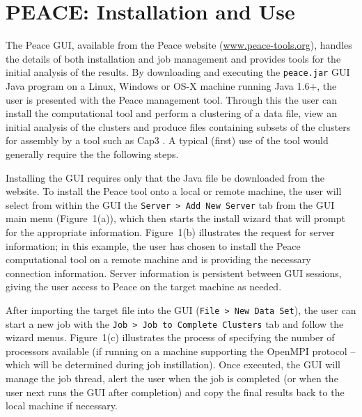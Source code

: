 \documentclass[a4,center,fleqn]{NAR}
\begin{document}
\enlargethispage{-65.1pt}

\section{PEACE: Installation and Use}

The {\sc Peace} GUI, available from the {\sc Peace} website
(\href{http://www.peace-tools.org}{www.peace-tools.org}), handles the
details of both installation and job management and provides tools for
the initial analysis of the results.  By downloading and executing the
{\tt peace.jar} GUI Java program on a Linux, Windows or OS-X machine
running Java 1.6+, the user is presented with the {\sc Peace}
management tool.  Through this the user can install the computational
tool and perform a clustering of a data file, view an initial analysis
of the clusters and produce files containing subsets of the clusters
for assembly by a tool such as {\sc Cap3} \cite{Huang99}.  A typical
(first) use of the tool would generally require the the following
steps.

 Installing the GUI requires only
that the Java file be downloaded from the website.  To install the {\sc
  Peace} tool onto a local or remote machine, the user will select
from within the GUI the {\tt Server > Add New Server} tab from the GUI
main menu (Figure~1(a)), which then starts the install
wizard that will prompt for the appropriate information.
Figure~1(b) illustrates the request for server information;
in this example, the user has chosen to install the {\sc Peace}
computational tool on a remote machine and is providing the necessary
connection information.  Server information is persistent between GUI
sessions, giving the user access to {\sc Peace} on the target machine
as needed.

 After importing the target file into
the GUI ({\tt File > New Data Set}), the user can start a new job with
the {\tt Job > Job to Complete Clusters} tab and follow the wizard
menus.  Figure~1(c) illustrates the process of specifying
the number of processors available (if running on a machine supporting
the OpenMPI protocol -- which will be determined during job
instillation).  Once executed, the GUI will manage the job thread,
alert the user when the job is completed (or when the user next
runs the GUI after completion) and 
copy the final results back to the local machine if necessary.
\end{document}
